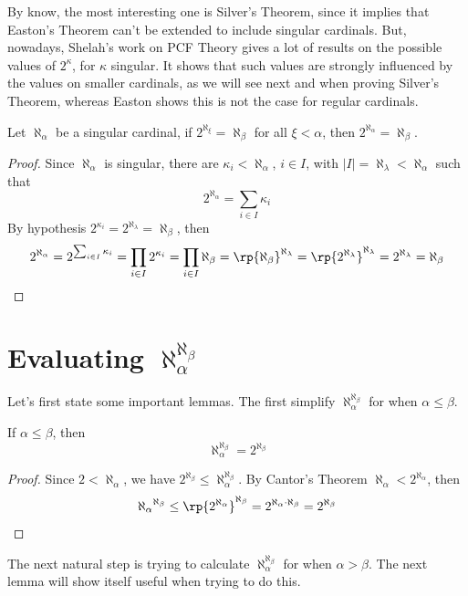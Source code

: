By know, the most interesting one is Silver's Theorem, since it implies that Easton's Theorem can't be extended to include singular cardinals. But, nowadays, Shelah's work on PCF Theory gives a lot of results on the possible values of $2^\kappa$, for $\kappa$ singular. It shows that such values are strongly influenced by the values on smaller cardinals, as we will see next and when proving Silver's Theorem, whereas Easton shows this is not the case for regular cardinals.

\begin{lemma}{}{}
    Let $\aleph_\alpha$ be a singular cardinal, if $2^{\aleph_\xi}=\aleph_\beta$ for all $\xi<\alpha$, then $2^{\aleph_\alpha}=\aleph_\beta$.
\end{lemma}

\begin{proof}
    Since $\aleph_\alpha$ is singular, there are $\kappa_i<\aleph_\alpha$, $i\in I$, with $|I|=\aleph_\lambda<\aleph_\alpha$ such that
    $$2^{\aleph_\alpha}=\sum_{i\in I}\kappa_i$$
    By hypothesis $2^{\kappa_i}=2^{\aleph_\lambda}=\aleph_\beta$, then
    $$2^{\aleph_\alpha}=2^{\sum_{i\in I}\kappa_i}=\prod_{i\in I}2^{\kappa_i}=\prod_{i\in I}\aleph_\beta=\rp{\aleph_\beta}^{\aleph_\lambda}=\rp{2^{\aleph_\lambda}}^{\aleph_\lambda}=2^{\aleph_\lambda}=\aleph_\beta$$
\end{proof}

\section{Evaluating \texorpdfstring{$\aleph_\alpha^{\aleph_\beta}$}{alepha alephb}}

Let's first state some important lemmas. The first simplify $\aleph_\alpha^{\aleph_\beta}$ for when $\alpha\leq\beta$.

\begin{lemma}{}{}\label{lemma_for_a<=b}
    If $\alpha\leq\beta$, then
    $$\aleph_\alpha^{\aleph_\beta}=2^{\aleph_\beta}$$
\end{lemma}

\begin{proof}
    Since $2<\aleph_\alpha$, we have $2^{\aleph_\beta}\leq\aleph_\alpha^{\aleph_\beta}$. By Cantor's Theorem $\aleph_\alpha<2^{\aleph_\alpha}$, then
    $${\aleph_\alpha}^{\aleph_\beta}\leq\rp{2^{\aleph_\alpha}}^{\aleph_\beta}=2^{\aleph_\alpha\cdot\aleph_\beta}=2^{\aleph_\beta}$$
\end{proof}

The next natural step is trying to calculate $\aleph_\alpha^{\aleph_\beta}$ for when $\alpha>\beta$. The next lemma will show itself useful when trying to do this.

